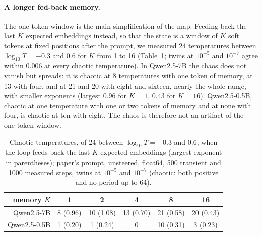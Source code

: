 \documentclass[11pt,letterpaper]{article}
\begin{document}
\paragraph{A longer fed-back memory.} The one-token window is the main simplification of the map. Feeding back the
last $K$ expected embeddings instead, so that the state is a window of $K$ soft tokens at fixed positions after the
prompt, we measured 24 temperatures between $\log_{10}T=-0.3$ and $0.6$ for $K$ from 1 to 16 (Table~\ref{tab:window};
twins at $10^{-5}$ and $10^{-7}$ agree within 0.006 at every chaotic temperature). In Qwen2.5-7B the chaos does not
vanish but spreads: it is chaotic at 8 temperatures with one token of memory, at 13 with four, and at 21 and 20 with
eight and sixteen, nearly the whole range, with smaller exponents (largest 0.96 for $K=1$, 0.43 for $K=16$).
Qwen2.5-0.5B, chaotic at one temperature with one or two tokens of memory and at none with four, is chaotic at ten
with eight. The chaos is therefore not an artifact of the one-token window.
\begin{table}[H]
\centering\small
\begin{tabular}{rccccc}
\toprule
memory $K$ & 1 & 2 & 4 & 8 & 16 \\
\midrule
Qwen2.5-7B & 8 (0.96) & 10 (1.08) & 13 (0.70) & 21 (0.58) & 20 (0.43) \\
Qwen2.5-0.5B & 1 (0.20) & 1 (0.24) & 0 & 10 (0.31) & 3 (0.23) \\
\bottomrule
\end{tabular}
\caption{Chaotic temperatures, of 24 between $\log_{10}T=-0.3$ and $0.6$, when the loop feeds back the last $K$
expected embeddings (largest exponent in parentheses); paper's prompt, unsteered, float64, 500 transient and 1000
measured steps, twins at $10^{-5}$ and $10^{-7}$ (chaotic: both positive and no period up to 64).}
\label{tab:window}
\end{table}
\end{document}
